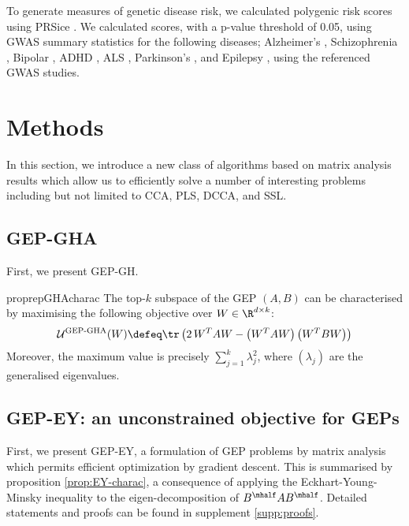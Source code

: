 To generate measures of genetic disease risk, we calculated polygenic risk scores using PRSice \cite{PRSice2014}. We calculated scores, with a p-value threshold of 0.05, using GWAS summary statistics for the following diseases; Alzheimer's \cite{Lambert2013}, Schizophrenia \cite{Trubetskoy2022}, Bipolar \cite{Mullins2021}, ADHD \cite{Demontis2023}, ALS \cite{Van_Rheenen2021}, Parkinson's \cite{Nalls2019}, and Epilepsy \cite{International_League_Against_Epilepsy_Consortium_on_Complex_Epilepsies2018}, using the referenced GWAS studies.


\section{Methods}

In this section, we introduce a new class of algorithms based on matrix analysis results which allow us to efficiently solve a number of interesting problems including but not limited to CCA, PLS, DCCA, and SSL.

\subsection{GEP-GHA}
First, we present GEP-GH.

\begin{restatable}{proprep}{GHAcharac}
    \label{prop:GHA-charac}
    The top-$k$ subspace of the GEP $(A,B)$ can be characterised by maximising the following objective over $W \in \R^{d \times k}$:
    \begin{align}
        \mathcal{U}^\text{GEP-GHA}(W) \defeq \tr \left( 2\, W^T A W - \left(W^T A W\right) \left(W^T B W\right) \right)
    \end{align}
    Moreover, the maximum value is precisely $\sum_{j=1}^k \lambda_j^2$, where $(\lambda_j)$ are the generalised eigenvalues.
\end{restatable}

\subsection{GEP-EY: an unconstrained objective for GEPs}

First, we present GEP-EY, a formulation of GEP problems by matrix analysis which permits efficient optimization by gradient descent.
This is summarised by proposition \ref{prop:EY-charac}, a consequence of applying the Eckhart-Young-Minsky inequality \cite{stewart_matrix_1990} to the eigen-decomposition of $B^\mhalf A B^\mhalf$. Detailed statements and proofs can be found in supplement \ref{supp:proofs}.

